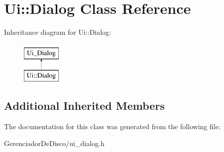 \hypertarget{classUi_1_1Dialog}{}\section{Ui\+:\+:Dialog Class Reference}
\label{classUi_1_1Dialog}
Inheritance diagram for Ui\+:\+:Dialog\+:\begin{figure}[H]
\begin{center}
\leavevmode
\includegraphics[height=2.000000cm]{classUi_1_1Dialog}
\end{center}
\end{figure}
\subsection*{Additional Inherited Members}


The documentation for this class was generated from the following file\+:\begin{DoxyCompactItemize}
\item 
Gerenciador\+De\+Disco/ui\+\_\+dialog.\+h\end{DoxyCompactItemize}
